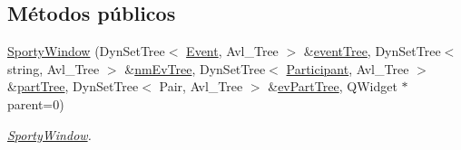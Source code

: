 \subsection*{Métodos públicos}
\begin{DoxyCompactItemize}
\item 
\hyperlink{class_sporty_window_aefcc1a9246b5509f53ccd6f2bc5fd71d}{Sporty\+Window} (Dyn\+Set\+Tree$<$ \hyperlink{class_event}{Event}, Avl\+\_\+\+Tree $>$ \&\hyperlink{class_sporty_window_ae5042630126b218d12b7f7b9b92c4307}{event\+Tree}, Dyn\+Set\+Tree$<$ string, Avl\+\_\+\+Tree $>$ \&\hyperlink{class_sporty_window_a1d1ad05d15c5b535772652e0f72afe04}{nm\+Ev\+Tree}, Dyn\+Set\+Tree$<$ \hyperlink{class_participant}{Participant}, Avl\+\_\+\+Tree $>$ \&\hyperlink{class_sporty_window_affb306650ea3c48ad8ffc219dcc8c0f7}{part\+Tree}, Dyn\+Set\+Tree$<$ Pair, Avl\+\_\+\+Tree $>$ \&\hyperlink{class_sporty_window_a042928055a5216651908f3797c1fc6e6}{ev\+Part\+Tree}, Q\+Widget $\ast$parent=0)
\begin{DoxyCompactList}\small\item\em \hyperlink{class_sporty_window}{Sporty\+Window}. \end{DoxyCompactList}\end{DoxyCompactItemize}
